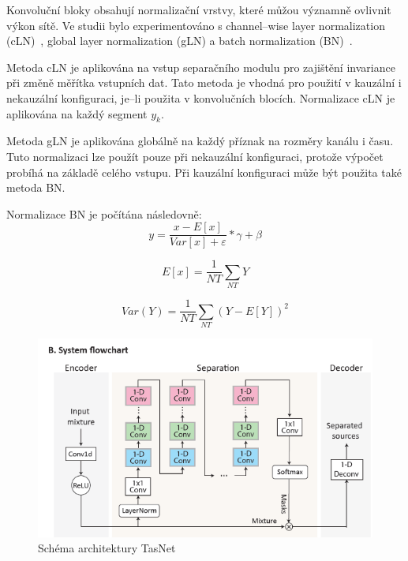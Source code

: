 Konvoluční bloky obsahují normalizační vrstvy, které můžou významně ovlivnit výkon sítě. Ve studii bylo experimentováno s channel--wise layer normalization (cLN)~, global layer normalization (gLN) a batch normalization (BN)~\cite{ioffe2015batch}.

Metoda cLN je aplikována na vstup separačního modulu pro zajištění invariance při změně měřítka vstupních dat. Tato metoda je vhodná pro použití v kauzální i nekauzální konfiguraci, je--li použita v konvolučních blocích. Normalizace cLN je aplikována na každý segment $y_k$. 

Metoda gLN je aplikována globálně na každý příznak na rozměry kanálu i času. Tuto normalizaci lze použít pouze při nekauzální konfiguraci, protože výpočet probíhá na základě celého vstupu.
Při kauzální konfiguraci může být použita také metoda BN.

Normalizace BN je počítána následovně:
\begin{equation}
	y = \frac{x - E[x]}{Var[x] + \varepsilon} * \gamma + \beta
\end{equation}

\begin{equation}
	E[x] = \frac{1}{NT} \sum_{NT}Y
\end{equation}

\begin{equation}
	Var(Y) = \frac{1}{NT} \sum_{NT}(Y - E[Y])^2
\end{equation}


\bigskip

\begin{figure}[H]
    \centering
    \includegraphics[scale=0.7]{obrazky-figures/tasnet-architecture.png}
    \caption{\label{fig:tasnet-modul}Schéma architektury TasNet}
\end{figure}



